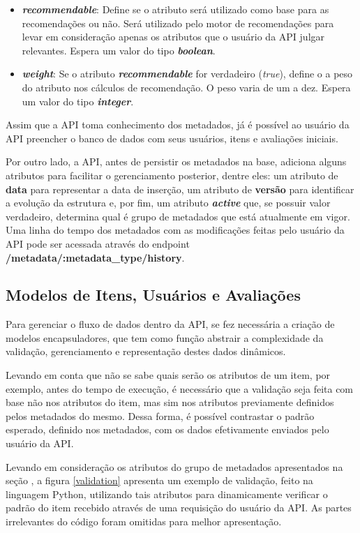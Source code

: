 \documentclass[12pt, openright, oneside, a4paper, brazil]{abntex2}
\begin{document}
\begin{itemize}
	\item \textbf{\textit{recommendable}}: Define se o atributo será utilizado como base para as recomendações ou não. Será utilizado pelo motor de recomendações para levar em consideração apenas os atributos que o usuário da API julgar relevantes. Espera um valor do tipo \textbf{\textit{boolean}}.

	\item \textbf{\textit{weight}}: Se o atributo \textbf{\textit{recommendable}} for verdadeiro (\textit{true}), define o a peso do atributo nos cálculos de recomendação. O peso varia de um a dez. Espera um valor do tipo \textbf{\textit{integer}}.
\end{itemize}

Assim que a API toma conhecimento dos metadados, já é possível ao usuário da API preencher o banco de dados com seus usuários, itens e avaliações iniciais. 

Por outro lado, a API, antes de persistir os metadados na base, adiciona alguns atributos para facilitar o gerenciamento posterior, dentre eles: um atributo de \textbf{data} para representar a data de inserção, um atributo de \textbf{versão} para identificar a evolução da estrutura e, por fim, um atributo \textbf{\textit{active}} que, se possuir valor verdadeiro, determina qual é grupo de metadados que está atualmente em vigor. Uma linha do tempo dos metadados com as modificações feitas pelo usuário da API pode ser acessada através do endpoint \textbf{/metadata/:metadata\_type/history}.

\subsection{Modelos de Itens, Usuários e Avaliações} \label{analisador:modelos}

Para gerenciar o fluxo de dados dentro da API, se fez necessária a criação de modelos encapsuladores, que tem como função abstrair a complexidade da validação, gerenciamento e representação destes dados dinâmicos.

Levando em conta que não se sabe quais serão os atributos de um item, por exemplo, antes do tempo de execução, é necessário que a validação seja feita com base não nos atributos do item, mas sim nos atributos previamente definidos pelos metadados do mesmo. Dessa forma, é possível contrastar o padrão esperado, definido nos metadados, com os dados efetivamente enviados pelo usuário da API.

Levando em consideração os atributos do grupo de metadados apresentados na seção , a figura \ref{validation} apresenta um exemplo de validação, feito na linguagem Python, utilizando tais atributos para dinamicamente verificar o padrão do item recebido através de uma requisição do usuário da API. As partes irrelevantes do código foram omitidas para melhor apresentação.
\end{document}
